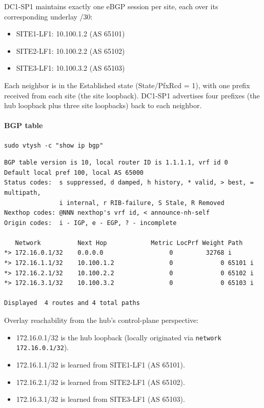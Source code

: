 \documentclass[11pt]{article}
\begin{document}
DC1-SP1 maintains exactly one eBGP session per site, each over its corresponding underlay /30:

\begin{itemize}
  \item SITE1-LF1: 10.100.1.2 (AS 65101)
  \item SITE2-LF1: 10.100.2.2 (AS 65102)
  \item SITE3-LF1: 10.100.3.2 (AS 65103)
\end{itemize}

Each neighbor is in the Established state (State/PfxRcd = 1), with one prefix received from each site (the site loopback). DC1-SP1 advertises four prefixes (the hub loopback plus three site loopbacks) back to each neighbor.

\paragraph{BGP table}

\begin{verbatim}
sudo vtysh -c "show ip bgp"
\end{verbatim}

\begin{verbatim}
BGP table version is 10, local router ID is 1.1.1.1, vrf id 0
Default local pref 100, local AS 65000
Status codes:  s suppressed, d damped, h history, * valid, > best, = multipath,
               i internal, r RIB-failure, S Stale, R Removed
Nexthop codes: @NNN nexthop's vrf id, < announce-nh-self
Origin codes:  i - IGP, e - EGP, ? - incomplete

   Network          Next Hop            Metric LocPrf Weight Path
*> 172.16.0.1/32    0.0.0.0                  0         32768 i
*> 172.16.1.1/32    10.100.1.2               0             0 65101 i
*> 172.16.2.1/32    10.100.2.2               0             0 65102 i
*> 172.16.3.1/32    10.100.3.2               0             0 65103 i

Displayed  4 routes and 4 total paths
\end{verbatim}

Overlay reachability from the hub’s control-plane perspective:

\begin{itemize}
  \item 172.16.0.1/32 is the hub loopback (locally originated via \texttt{network 172.16.0.1/32}).
  \item 172.16.1.1/32 is learned from SITE1-LF1 (AS 65101).
  \item 172.16.2.1/32 is learned from SITE2-LF1 (AS 65102).
  \item 172.16.3.1/32 is learned from SITE3-LF1 (AS 65103).
\end{itemize}
\end{document}
